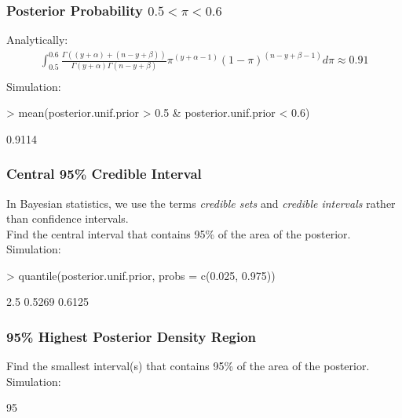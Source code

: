 \documentclass[handout]{beamer}
\begin{document}
\begin{frame}[fragile]
\frametitle{Posterior Probability $0.5 < \pi < 0.6$}
\pause
Analytically:
\begin{eqnarray*}
\int_{0.5}^{0.6}  \frac{\Gamma ((y+\alpha) + (n-y+\beta))}{\Gamma (y+\alpha)
\Gamma (n-y+\beta)} \pi^{(y+\alpha - 1)} (1 - \pi)^{(n-y+\beta-1)}
d\pi \approx 0.91\\
\end{eqnarray*}
\pause
\bigskip
Simulation:
\tiny
\begin{Schunk}
\begin{Sinput}
> mean(posterior.unif.prior > 0.5 & posterior.unif.prior < 0.6)
\end{Sinput}
\begin{Soutput}
[1] 0.9114
\end{Soutput}
\end{Schunk}
\end{frame}

\begin{frame}[fragile]
\frametitle{Central 95\% Credible Interval}
\pause
In Bayesian statistics, we use the terms \textit{credible sets} and
\textit{credible intervals} rather than confidence intervals.\\
\bigskip
\pause
Find the central interval that contains 95\% of the area of the
posterior. \\
\bigskip
\pause
\bigskip
Simulation:
\bigskip
\tiny
\begin{Schunk}
\begin{Sinput}
> quantile(posterior.unif.prior, probs = c(0.025, 0.975))
\end{Sinput}
\begin{Soutput}
  2.5%
0.5269 0.6125 
\end{Soutput}
\end{Schunk}
\normalsize
\end{frame}


\begin{frame}[fragile]
\frametitle{95\% Highest Posterior Density Region}
\pause
Find the smallest interval(s) that contains 95\% of the area of the
posterior. \\
\bigskip
\pause
\bigskip
Simulation:
\bigskip
\tiny
\begin{Schunk}
\begin{Soutput}
      [,1]   [,2]
95%
\end{Soutput}
\end{Schunk}
\normalsize
\end{frame}
\end{document}
